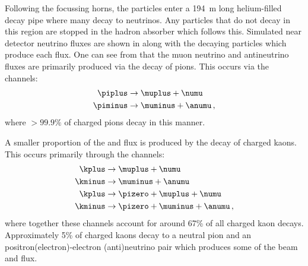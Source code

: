Following the focussing horns, the particles enter a \SI{194}{\metre} long helium-filled decay pipe where many decay to neutrinos.
Any particles that do not decay in this region are stopped in the hadron absorber which follows this.
Simulated near detector neutrino fluxes are shown in  along with the decaying particles which produce each flux.
One can see from  that the muon neutrino and antineutrino fluxes are primarily produced via the decay of pions.
This occurs via the channels:
\begin{align}
  \piplus &\rightarrow \muplus + \numu \\
  \piminus &\rightarrow \muminus + \anumu \, ,
\end{align}
where $>99.9\%$ of charged pions decay in this manner.

A smaller proportion of the \numu and \anumu flux is produced by the decay of charged kaons.
This occurs primarily through the channels:
\begin{align}
  \kplus &\rightarrow \muplus + \numu \\
  \kminus &\rightarrow \muminus + \anumu \\
  \kplus &\rightarrow \pizero + \muplus + \numu \\
  \kminus &\rightarrow \pizero + \muminus + \anumu \, ,
\end{align}
where together these channels account for around 67\% of all charged kaon decays.
Approximately 5\% of charged kaons decay to a neutral pion and an positron(electron)-electron (anti)neutrino pair which produces some of the beam \nue and \anue flux.

